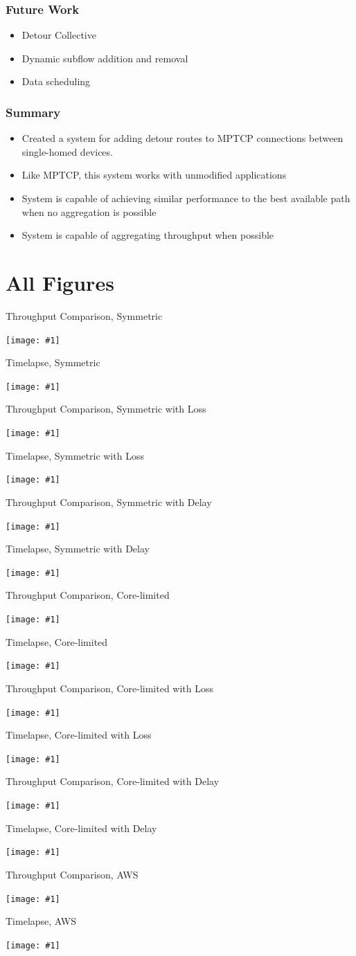 \documentclass{beamer}
\newcommand{\TitledFigureSlide}[3]{
  \begin{frame}{#2}
    \begin{centering}
      \vfill
      \texttt{[image: \#1]}
      \vfill
      \end{centering}
      \note{#3}
  \end{frame}
}
\begin{document}
\begin{frame}
  \frametitle{Future Work}

  \begin{itemize}
  \item Detour Collective
  \item Dynamic subflow addition and removal
  \item Data scheduling
  \end{itemize}
\end{frame}

\begin{frame}
  \frametitle{Summary}

  \begin{itemize}
  \item Created a system for adding detour routes to MPTCP connections between
    single-homed devices.
  \item Like MPTCP, this system works with unmodified applications
  \item System is capable of achieving similar performance to the best available
    path when no aggregation is possible
  \item System is capable of aggregating throughput when possible
  \end{itemize}
\end{frame}

\appendix %

\section{All Figures}
\TitledFigureSlide{figures/sym.pdf}{Throughput Comparison, Symmetric}{}
\TitledFigureSlide{figures/timegrid-sym.pdf}{Timelapse, Symmetric}{}

\TitledFigureSlide{figures/sym-lossy.pdf}{Throughput Comparison, Symmetric with Loss}{}
\TitledFigureSlide{figures/timegrid-sym-lossy.pdf}{Timelapse, Symmetric with Loss}{}

\TitledFigureSlide{figures/sym-delayed.pdf}{Throughput Comparison, Symmetric with Delay}{}
\TitledFigureSlide{figures/timegrid-sym-delayed.pdf}{Timelapse, Symmetric with Delay}{}


\TitledFigureSlide{figures/easy.pdf}{Throughput Comparison, Core-limited}{}
\TitledFigureSlide{figures/timegrid-easy.pdf}{Timelapse, Core-limited}{}

\TitledFigureSlide{figures/lossy.pdf}{Throughput Comparison, Core-limited with Loss}{}
\TitledFigureSlide{figures/timegrid-lossy.pdf}{Timelapse, Core-limited with Loss}{}

\TitledFigureSlide{figures/delayed.pdf}{Throughput Comparison, Core-limited with Delay}{}
\TitledFigureSlide{figures/timegrid-delayed.pdf}{Timelapse, Core-limited with Delay}{}

\TitledFigureSlide{figures/aws.pdf}{Throughput Comparison, AWS}{}
\TitledFigureSlide{figures/timegrid-aws.pdf}{Timelapse, AWS}{}
\end{document}
